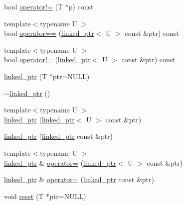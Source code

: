 \begin{DoxyCompactItemize}
\item 
bool \hyperlink{classtesting_1_1internal_1_1linked__ptr_a3685f9661bbe410cfa58fea2f14396b7}{operator!=} (T $\ast$p) const 
\item 
{\footnotesize template$<$typename U $>$ }\\bool \hyperlink{classtesting_1_1internal_1_1linked__ptr_a3b46c9ecfd928673a524dcb3c70fd2ad}{operator==} (\hyperlink{classtesting_1_1internal_1_1linked__ptr}{linked\-\_\-ptr}$<$ U $>$ const \&ptr) const 
\item 
{\footnotesize template$<$typename U $>$ }\\bool \hyperlink{classtesting_1_1internal_1_1linked__ptr_a6449584b90a09a313300599fb3a23633}{operator!=} (\hyperlink{classtesting_1_1internal_1_1linked__ptr}{linked\-\_\-ptr}$<$ U $>$ const \&ptr) const 
\item 
\hyperlink{classtesting_1_1internal_1_1linked__ptr_ae805418b9f03f14ff49649e710475dba}{linked\-\_\-ptr} (T $\ast$ptr=N\-U\-L\-L)
\item 
\hyperlink{classtesting_1_1internal_1_1linked__ptr_af99460fd09ca0f83e061ea480ef1a45e}{$\sim$linked\-\_\-ptr} ()
\item 
{\footnotesize template$<$typename U $>$ }\\\hyperlink{classtesting_1_1internal_1_1linked__ptr_a7597ed91006edd0467c99bd1aaab07f5}{linked\-\_\-ptr} (\hyperlink{classtesting_1_1internal_1_1linked__ptr}{linked\-\_\-ptr}$<$ U $>$ const \&ptr)
\item 
\hyperlink{classtesting_1_1internal_1_1linked__ptr_abc076b5678cc7f64306d5ecfefc93aff}{linked\-\_\-ptr} (\hyperlink{classtesting_1_1internal_1_1linked__ptr}{linked\-\_\-ptr} const \&ptr)
\item 
{\footnotesize template$<$typename U $>$ }\\\hyperlink{classtesting_1_1internal_1_1linked__ptr}{linked\-\_\-ptr} \& \hyperlink{classtesting_1_1internal_1_1linked__ptr_a82608d98869b750d9ab729f1450a9a45}{operator=} (\hyperlink{classtesting_1_1internal_1_1linked__ptr}{linked\-\_\-ptr}$<$ U $>$ const \&ptr)
\item 
\hyperlink{classtesting_1_1internal_1_1linked__ptr}{linked\-\_\-ptr} \& \hyperlink{classtesting_1_1internal_1_1linked__ptr_a1f40b5e66e6cf7b661ea116c806f952e}{operator=} (\hyperlink{classtesting_1_1internal_1_1linked__ptr}{linked\-\_\-ptr} const \&ptr)
\item 
void \hyperlink{classtesting_1_1internal_1_1linked__ptr_a95ba3b7b66ed0193c779976c6e126ab6}{reset} (T $\ast$ptr=N\-U\-L\-L)
\item 

\end{DoxyCompactItemize}
